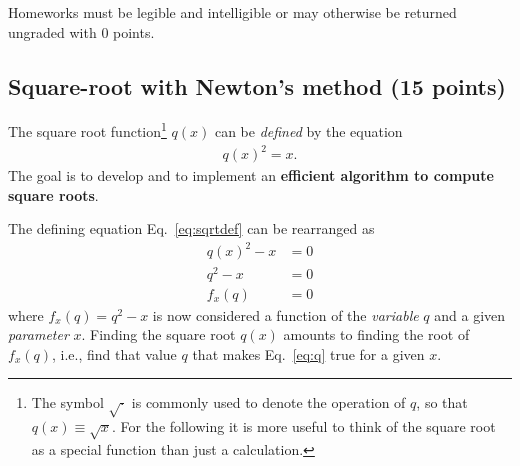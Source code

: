 \documentclass[letterpaper]{scrartcl}
\begin{document}
Homeworks must be legible and intelligible or may otherwise be
returned ungraded with 0 points.

\subsection{Square-root with Newton's method (15 points)}
\label{sec:sqrt}

The square root function\footnote{The symbol $\sqrt{\cdot}$ is
  commonly used to denote the operation of $q$, so that
  $q(x) \equiv \sqrt{x}$. For the following it is more useful to think
  of the square root as a special function than just a calculation.}
$q(x)$ can be \emph{defined} by the equation
\begin{gather}
  \label{eq:sqrtdef}
  q(x)^{2} = x.
\end{gather}
The goal is to develop and to implement an \textbf{efficient algorithm
to compute square roots}.

The defining equation Eq.~\ref{eq:sqrtdef} can be rearranged as 
\begin{align}
  q(x)^{2} - x &= 0   \label{eq:sqrtroot}\\
  q^{2} - x &= 0 \label{eq:q}\\
  f_{x}(q) &= 0 \label{eq:fqx}
\end{align}
where $f_{x}(q) = q^{2} - x$ is now considered a function of the
\emph{variable} $q$ and a given \emph{parameter} $x$. Finding the
square root $q(x)$ amounts to finding the root of $f_{x}(q)$, i.e.,
find that value $q$ that makes Eq.~\ref{eq:q} true for a given $x$.
\end{document}
